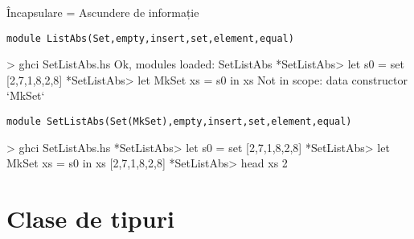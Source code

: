 \documentclass[handout,xcolor=pdftex,romanian,colorlinks]{beamer}
\begin{document}
\begin{frame}[fragile]{Încapsulare = Ascundere de informație}
\begin{block}{\lstinline"module ListAbs(Set,empty,insert,set,element,equal)"}
\begin{asciihs}
> ghci SetListAbs.hs
Ok, modules loaded: SetListAbs
*SetListAbs> let s0 = set [2,7,1,8,2,8]
*SetListAbs> let MkSet xs = s0 in xs
Not in scope: data constructor `MkSet`
\end{asciihs}
\end{block}
\begin{block}{\lstinline"module SetListAbs(Set(MkSet),empty,insert,set,element,equal)"}
\begin{asciihs}
> ghci SetListAbs.hs
*SetListAbs> let s0 = set [2,7,1,8,2,8]
*SetListAbs> let MkSet xs = s0 in xs 
[2,7,1,8,2,8]
*SetListAbs> head xs
2
\end{asciihs}
\end{block}
\end{frame}
%
%
%
%
%
%

\section{Clase de tipuri}
\end{document}
